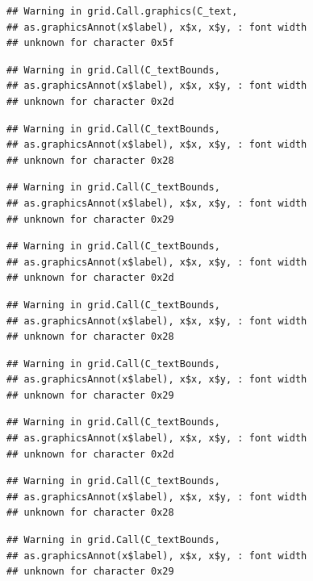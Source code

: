 \documentclass[
]{book}
\begin{document}
\begin{verbatim}
## Warning in grid.Call.graphics(C_text,
## as.graphicsAnnot(x$label), x$x, x$y, : font width
## unknown for character 0x5f
\end{verbatim}

\begin{verbatim}
## Warning in grid.Call(C_textBounds,
## as.graphicsAnnot(x$label), x$x, x$y, : font width
## unknown for character 0x2d
\end{verbatim}

\begin{verbatim}
## Warning in grid.Call(C_textBounds,
## as.graphicsAnnot(x$label), x$x, x$y, : font width
## unknown for character 0x28
\end{verbatim}

\begin{verbatim}
## Warning in grid.Call(C_textBounds,
## as.graphicsAnnot(x$label), x$x, x$y, : font width
## unknown for character 0x29
\end{verbatim}

\begin{verbatim}
## Warning in grid.Call(C_textBounds,
## as.graphicsAnnot(x$label), x$x, x$y, : font width
## unknown for character 0x2d
\end{verbatim}

\begin{verbatim}
## Warning in grid.Call(C_textBounds,
## as.graphicsAnnot(x$label), x$x, x$y, : font width
## unknown for character 0x28
\end{verbatim}

\begin{verbatim}
## Warning in grid.Call(C_textBounds,
## as.graphicsAnnot(x$label), x$x, x$y, : font width
## unknown for character 0x29
\end{verbatim}

\begin{verbatim}
## Warning in grid.Call(C_textBounds,
## as.graphicsAnnot(x$label), x$x, x$y, : font width
## unknown for character 0x2d
\end{verbatim}

\begin{verbatim}
## Warning in grid.Call(C_textBounds,
## as.graphicsAnnot(x$label), x$x, x$y, : font width
## unknown for character 0x28
\end{verbatim}

\begin{verbatim}
## Warning in grid.Call(C_textBounds,
## as.graphicsAnnot(x$label), x$x, x$y, : font width
## unknown for character 0x29
\end{verbatim}
\end{document}

